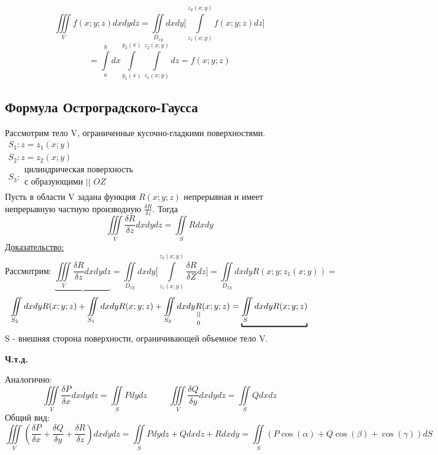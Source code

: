 \documentclass[12pt]{article}
\newcommand{\verteq}{\rotatebox{90}{$\,=$}}
\newcommand{\equalto}[2]{\underset{\scriptstyle\overset{\mkern4mu\verteq}{#2}}{#1}}
\let\oldint\int
\let\oldiint\iint
\let\oldiiint\iiint
\renewcommand{\int}{\oldint\limits}
\renewcommand{\iint}{\oldiint\limits}
\renewcommand{\iiint}{\oldiiint\limits}
\begin{document}
  \hspace{1em}
  \begin{minipage}{0.55\textwidth}
    \[\iiint_V f(x;y;z) dxdydz = \iint_{D_{xy}}dxdy \Bigg[\int_{z_1(x;y)}^{z_2(x;y)}f(x;y;z)dz \Bigg]\]
    \[=\int_{a}^{b}dx \int_{y_1(x)}^{y_2(x)}\int_{z_1(x;y)}^{z_2(x;y)}dz=f(x;y;z)\]
  \end{minipage}
  \vspace{1em}
  \par
  \subsection{Формула Остроградского-Гаусса}
  Рассмотрим тело V, ограниченные кусочно-гладкими поверхностями. $\begin{matrix}
    S_1: z=z_1(x;y)\\
    S_2: z=z_2(x;y)\\
    S_3: \begin{matrix}
      \text{цилиндрическая поверхность}\\
      \text{с образующими || } OZ
    \end{matrix}
  \end{matrix}$\\
  Пусть в области V задана функция $R(x;y;z)$ непрерывная и имеет непрерывную частную производную $\frac{\delta R}{\delta z}$. 
  Тогда \[\iiint_V \frac{\delta R}{\delta z}dxdydz=\iint_S R dxdy\]
  \underline{Доказательство:}
    \[\text{Рассмотрим: }\underbrace{\iiint_V \frac{\delta R}{\delta z}dxdydz}=
    \iint_{D_{xy}}dxdy \Big[\int_{z_1(x;y)}^{z_2 (x;y)} \frac{\delta R}{\delta Z}dz\Big]=
    \iint_{D_{xy}}dxdy R(x;y;z_1(x;y))=\]
    \[\iint_{S_2}dxdy R(x;y;z)+
    \iint_{S_1}dxdy R(x;y;z)+
    \iint_{S_3}dxdy \equalto{R}{0}(x;y;z)=
    \underbracket{\iint_S dxdy R(x;y;z)}
    \]
  S - внешняя сторона поверхности, ограничивающей объемное тело V.
  \begin{center}
    \textbf{Ч.т.д.}
  \end{center}
  Аналогично: 
  \[\iiint_V \frac{\delta P}{\delta x}dxdydz = \iint_S P dydz \hspace{30pt} 
  \iiint_V \frac{\delta Q}{\delta y} dxdydz = \iint_S Q dxdz\]
  Общий вид:
  \[\iiint_V (\frac{\delta P}{\delta x}+\frac{\delta Q}{\delta y}+\frac{\delta R}{\delta z})dxdydz=
  \iint_S P dydz +Q dxdz+ R dxdy = 
  \iint_S(P\cos(\alpha)+Q\cos(\beta)+\cos(\gamma))dS\]
\end{document}
